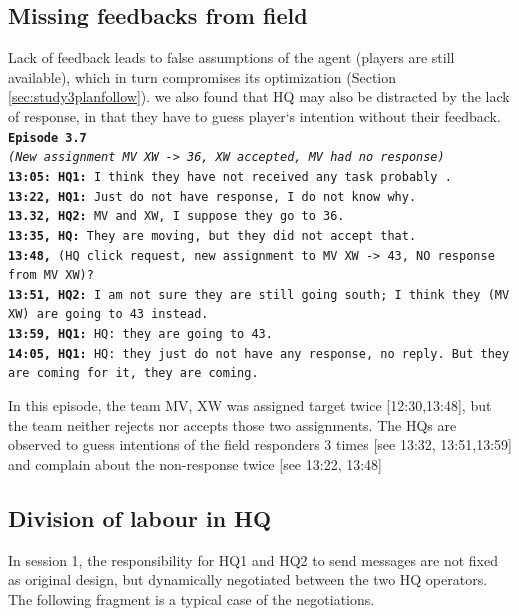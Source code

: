 \subsection{Missing feedbacks from field}
Lack of feedback leads to false assumptions of the agent (players are still available), which in turn compromises its optimization (Section \ref{sec:study3planfollow}). we also found that HQ may also be distracted by the lack of response, in that they have to guess player`s intention without their feedback. \\

\noindent\texttt{\textbf{Episode 3.7}\\
\emph{(New assignment MV XW -> 36, XW accepted, MV had no response)}\\
\textbf{13:05: HQ1: } I think they have not received any task probably . \\
\textbf{13:22, HQ1: } Just do not have response, I do not know why.  \\
\textbf{13.32, HQ2: } MV and XW, I suppose they go to 36. \\
\textbf{13:35, HQ: } They are moving, but they did not accept that. \\
\textbf{13:48, } (HQ click request, new assignment to MV XW -> 43, NO response from MV XW)?\\
\textbf{13:51, HQ2: } I am not sure they are still going south; I think they (MV XW) are going to 43 instead. \\
\textbf{13:59, HQ1: } HQ: they are going to 43.\\
\textbf{14:05, HQ1: } HQ: they just do not have any response, no reply. But they are coming for it, they are coming. \\
}

In this episode, the team MV, XW was assigned target twice [12:30,13:48], but the team neither rejects nor accepts those two assignments. The HQs are observed to guess intentions of the field responders 3 times [see 13:32, 13:51,13:59] and complain about the non-response twice [see 13:22, 13:48]

\subsection{Division of labour in HQ}

In session 1, the responsibility for HQ1 and HQ2 to send messages are not fixed as original design, but dynamically negotiated between the two HQ operators. The following fragment is a typical case of the negotiations.\\

